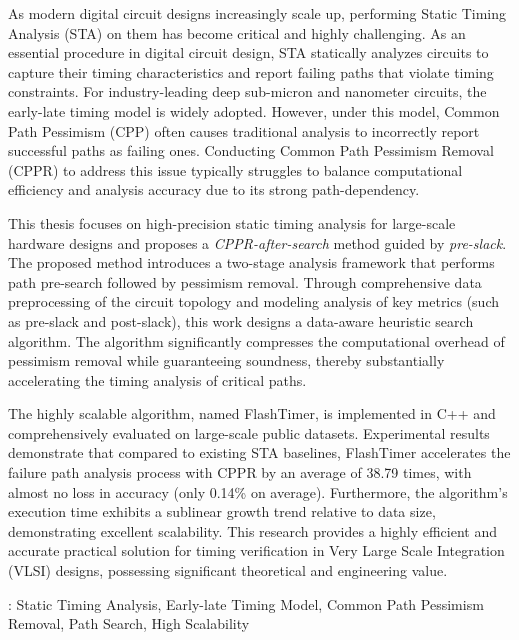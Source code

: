 \begin{abstract*}
As modern digital circuit designs increasingly scale up, performing Static Timing Analysis (STA) on them has become critical and highly challenging. As an essential procedure in digital circuit design, STA statically analyzes circuits to capture their timing characteristics and report failing paths that violate timing constraints. For industry-leading deep sub-micron and nanometer circuits, the early-late timing model is widely adopted. However, under this model, Common Path Pessimism (CPP) often causes traditional analysis to incorrectly report successful paths as failing ones. Conducting Common Path Pessimism Removal (CPPR) to address this issue typically struggles to balance computational efficiency and analysis accuracy due to its strong path-dependency.

This thesis focuses on high-precision static timing analysis for large-scale hardware designs and proposes a \textit{CPPR-after-search} method guided by \textit{pre-slack}. The proposed method introduces a two-stage analysis framework that performs path pre-search followed by pessimism removal. Through comprehensive data preprocessing of the circuit topology and modeling analysis of key metrics (such as pre-slack and post-slack), this work designs a data-aware heuristic search algorithm. The algorithm significantly compresses the computational overhead of pessimism removal while guaranteeing soundness, thereby substantially accelerating the timing analysis of critical paths.

The highly scalable algorithm, named FlashTimer, is implemented in C++ and comprehensively evaluated on large-scale public datasets. Experimental results demonstrate that compared to existing STA baselines, FlashTimer accelerates the failure path analysis process with CPPR by an average of 38.79 times, with almost no loss in accuracy (only 0.14\% on average). Furthermore, the algorithm's execution time exhibits a sublinear growth trend relative to data size, demonstrating excellent scalability. This research provides a highly efficient and accurate practical solution for timing verification in Very Large Scale Integration (VLSI) designs, possessing significant theoretical and engineering value.

\vskip 12bp
: Static Timing Analysis, Early-late Timing Model, Common Path Pessimism Removal, Path Search, High Scalability
\end{abstract*}